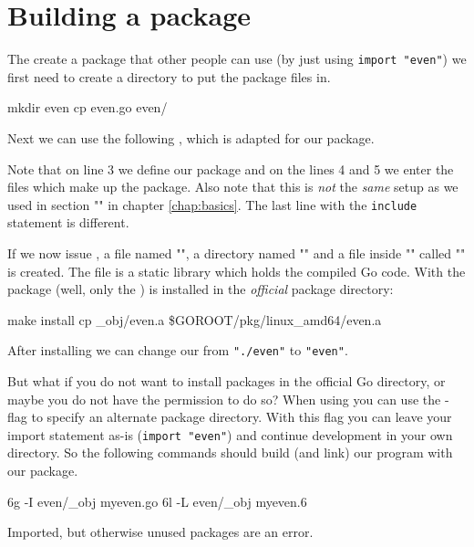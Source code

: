 \section{Building a package}
\label{sec:building a package}
The create a package that other people can use (by just using
\lstinline{import "even"}) we first need to create a directory
to put the package files in. 
\begin{display}
\pr mkdir even
\pr cp even.go even/
\end{display}
\noindent{}Next we 
can use the following 
, which 
is adapted for our  package.

Note that on line 3 we define our  package and on the
lines 4 and 5 we enter the files which make up the package.
Also note that this is \emph{not} the \emph{same}  setup as we used
in section "" in chapter
\ref{chap:basics}. The last line with the \verb|include| statement is
different.

If we now issue , a file named "", a directory
named "" and a file inside "" called
""
is created. The file  is a static library which holds
the compiled Go code.
With  the package (well, only the ) is installed in the \emph{official}
package directory:
\begin{display}
\pr make install
cp \_obj/even.a \$GOROOT/pkg/linux\_amd64/even.a
\end{display}
\noindent{}After installing we can change our  from
\lstinline{"./even"} to \lstinline{"even"}.

But what if you do not want to install packages in the official Go
directory, or maybe you do not have the permission to do so? When using
 you can use the -flag to specify an alternate
package directory. With this flag you can leave your import statement
as-is (\lstinline{import "even"}) and continue development in your
own directory. So the following commands should build (and link) our
 program with our package.
\begin{display}
\pr 6g -I even/\_obj myeven.go	
\pr 6l -L even/\_obj myeven.6	
\end{display}

\noindent{}Imported, but otherwise unused packages are an error.

